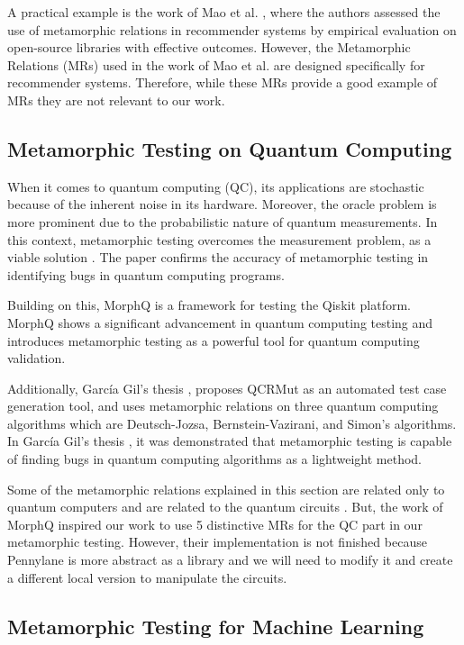 \documentclass[12pt,a4paper]{article}
\begin{document}
	A practical example is the work of Mao et al. \cite{cmao2024}, where the authors assessed the use of metamorphic relations in recommender systems by empirical evaluation on open-source libraries with effective outcomes. However, the Metamorphic Relations (MRs) used in the work of Mao et al. \cite{cmao2024} are designed specifically for recommender systems. Therefore, while these MRs provide a good example of MRs they are not relevant to our work.
	
	\subsection{Metamorphic Testing on Quantum Computing}
	
	When it comes to quantum computing (QC), its applications are stochastic because of the inherent noise in its hardware. Moreover, the oracle problem is more prominent due to the probabilistic nature of quantum measurements. In this context, metamorphic testing overcomes the measurement problem, as a viable solution \cite{rabreu2022}. The paper confirms the accuracy of metamorphic testing in identifying bugs in quantum computing programs. 
	
	Building on this, \cite{Paltenghi2023} MorphQ is a framework for testing the Qiskit platform. MorphQ shows a significant advancement in quantum computing testing and introduces metamorphic testing as a powerful tool for quantum computing validation. 
	
	Additionally, García Gil’s thesis \cite{gracia2024}, proposes QCRMut as an automated test case generation tool, and uses metamorphic relations on three quantum computing algorithms which are Deutsch-Jozsa, Bernstein-Vazirani, and Simon’s algorithms. In García Gil’s thesis \cite{gracia2024}, it was demonstrated that metamorphic testing is capable of finding bugs in quantum computing algorithms as a lightweight method.
	
	Some of the metamorphic relations explained in this section are related only to quantum computers and are related to the quantum circuits \cite{rabreu2022} \cite{gracia2024}. But, the work of MorphQ \cite{Paltenghi2023} inspired our work to use 5 distinctive MRs for the QC part in our metamorphic testing. However, their implementation is not finished because Pennylane is more abstract as a library and we will need to modify it and create a different local version to manipulate the circuits.
	
	\subsection{Metamorphic Testing for Machine Learning}
	
\end{document}
